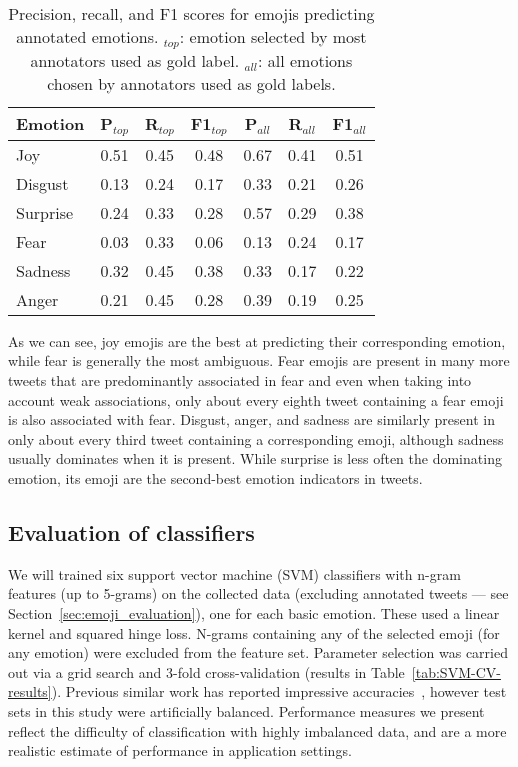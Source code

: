 \documentclass[10pt, a4paper]{article}
\begin{document}
\begin{table}[!ht]
\centering
\begin{tabular}{l | c | c | c | c | c | c}
\textbf{Emotion} & \textbf{P$_{top}$} & \textbf{R$_{top}$} & \textbf{F1$_{top}$} & \textbf{P$_{all}$} & \textbf{R$_{all}$} & \textbf{F1$_{all}$} \\\hline
Joy & 0.51 & 0.45 & 0.48 & 0.67 & 0.41 & 0.51 \\
Disgust & 0.13 & 0.24 & 0.17 & 0.33 & 0.21 & 0.26 \\
Surprise & 0.24 & 0.33 & 0.28 & 0.57 & 0.29 & 0.38 \\
Fear & 0.03 & 0.33 & 0.06 & 0.13 & 0.24 & 0.17 \\
Sadness & 0.32 & 0.45 & 0.38 & 0.33 & 0.17 & 0.22 \\
Anger & 0.21 & 0.45 & 0.28 & 0.39 & 0.19 & 0.25
\end{tabular}
\caption{Precision, recall, and F1 scores for emojis predicting annotated emotions. $_{top}$: emotion selected by most annotators used as gold label. $_{all}$: all emotions chosen by annotators used as gold labels.}
\label{tab:precision_emojis}
\end{table}

As we can see, joy emojis are the best at predicting their corresponding emotion, while fear is generally the most ambiguous. Fear emojis are present in many more tweets that are predominantly associated in fear and even when taking into account weak associations, only about every eighth tweet containing a fear emoji is also associated with fear. Disgust, anger, and sadness are similarly present in only about every third tweet containing a corresponding emoji, although sadness usually dominates when it is present. While surprise is less often the dominating emotion, its emoji are the second-best emotion indicators in tweets.

\subsection{Evaluation of classifiers}
\label{sec:classifier_evaluation}
We will trained six support vector machine (SVM) classifiers with n-gram features (up to 5-grams) on the collected data (excluding annotated tweets --- see Section~\ref{sec:emoji_evaluation}), one for each basic emotion. 
These used a linear kernel and squared hinge loss.
N-grams containing any of the selected emoji (for any emotion) were excluded from the feature set.
Parameter selection was carried out via a grid search and 3-fold cross-validation (results in Table~\ref{tab:SVM-CV-results}).
Previous similar work has reported impressive accuracies~\cite{Purver2012Experimenting}, however test sets in this study were artificially balanced. 
Performance measures we present reflect the difficulty of classification with highly imbalanced data, and are a more realistic estimate of performance in application settings.
\end{document}
